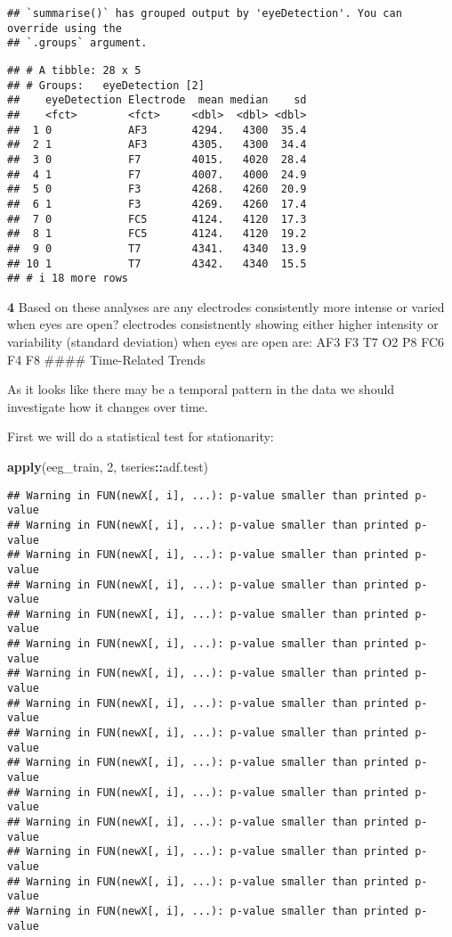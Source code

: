 \documentclass[
]{article}
\newenvironment{Shaded}{\begin{snugshade}}{\end{snugshade}}
\newcommand{\DecValTok}[1]{\textcolor[rgb]{0.00,0.00,0.81}{#1}}
\newcommand{\FunctionTok}[1]{\textcolor[rgb]{0.13,0.29,0.53}{\textbf{#1}}}
\newcommand{\NormalTok}[1]{#1}
\newcommand{\SpecialCharTok}[1]{\textcolor[rgb]{0.81,0.36,0.00}{\textbf{#1}}}
\begin{document}
\begin{verbatim}
## `summarise()` has grouped output by 'eyeDetection'. You can override using the
## `.groups` argument.
\end{verbatim}

\begin{verbatim}
## # A tibble: 28 x 5
## # Groups:   eyeDetection [2]
##    eyeDetection Electrode  mean median    sd
##    <fct>        <fct>     <dbl>  <dbl> <dbl>
##  1 0            AF3       4294.   4300  35.4
##  2 1            AF3       4305.   4300  34.4
##  3 0            F7        4015.   4020  28.4
##  4 1            F7        4007.   4000  24.9
##  5 0            F3        4268.   4260  20.9
##  6 1            F3        4269.   4260  17.4
##  7 0            FC5       4124.   4120  17.3
##  8 1            FC5       4124.   4120  19.2
##  9 0            T7        4341.   4340  13.9
## 10 1            T7        4342.   4340  15.5
## # i 18 more rows
\end{verbatim}

\textbf{4} Based on these analyses are any electrodes consistently more
intense or varied when eyes are open? electrodes consistnently showing
either higher intensity or variability (standard deviation) when eyes
are open are: AF3 F3 T7 O2 P8 FC6 F4 F8 \#\#\#\# Time-Related Trends

As it looks like there may be a temporal pattern in the data we should
investigate how it changes over time.

First we will do a statistical test for stationarity:

\begin{Shaded}
\begin{Highlighting}[]
\FunctionTok{apply}\NormalTok{(eeg\_train, }\DecValTok{2}\NormalTok{, tseries}\SpecialCharTok{::}\NormalTok{adf.test)}
\end{Highlighting}
\end{Shaded}

\begin{verbatim}
## Warning in FUN(newX[, i], ...): p-value smaller than printed p-value
## Warning in FUN(newX[, i], ...): p-value smaller than printed p-value
## Warning in FUN(newX[, i], ...): p-value smaller than printed p-value
## Warning in FUN(newX[, i], ...): p-value smaller than printed p-value
## Warning in FUN(newX[, i], ...): p-value smaller than printed p-value
## Warning in FUN(newX[, i], ...): p-value smaller than printed p-value
## Warning in FUN(newX[, i], ...): p-value smaller than printed p-value
## Warning in FUN(newX[, i], ...): p-value smaller than printed p-value
## Warning in FUN(newX[, i], ...): p-value smaller than printed p-value
## Warning in FUN(newX[, i], ...): p-value smaller than printed p-value
## Warning in FUN(newX[, i], ...): p-value smaller than printed p-value
## Warning in FUN(newX[, i], ...): p-value smaller than printed p-value
## Warning in FUN(newX[, i], ...): p-value smaller than printed p-value
## Warning in FUN(newX[, i], ...): p-value smaller than printed p-value
## Warning in FUN(newX[, i], ...): p-value smaller than printed p-value
\end{verbatim}
\end{document}
